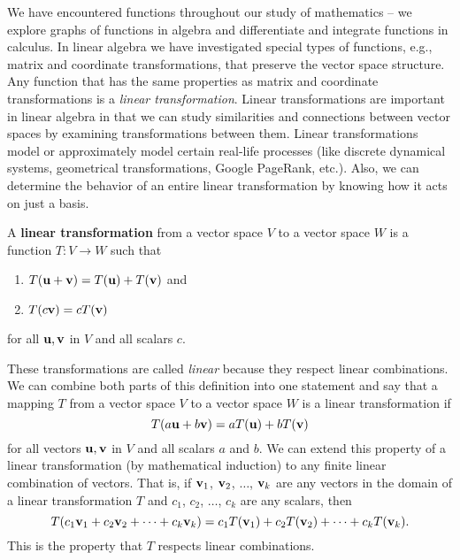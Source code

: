 We have encountered functions throughout our study of mathematics -- we explore graphs of functions in algebra and differentiate and integrate functions in calculus. In linear algebra we have investigated special types of functions, e.g., matrix and coordinate transformations, that preserve the vector space structure. Any function that has the same properties as matrix and coordinate transformations is a \emph{linear transformation}. Linear transformations are important in linear algebra in that we can study similarities and connections between vector spaces by examining transformations between them. Linear transformations model or approximately model certain real-life processes (like discrete dynamical systems, geometrical transformations, Google PageRank, etc.). Also, we can determine the behavior of an entire linear transformation  by knowing how it acts on just a basis.

\begin{definition} A \textbf{linear transformation} from a vector space $V$ to a vector space $W$ is a function $T: V \to W$ such that
\begin{enumerate}
\item $T(\mathbf{u} + \mathbf{v}) = T(\mathbf{u}) + T(\mathbf{v})$ and
\item $T(c\mathbf{v}) = cT(\mathbf{v})$
\end{enumerate}
for all $\mathbf{u}, \mathbf{v}$ in $V$ and all scalars $c$.
\end{definition}

These transformations are called \emph{linear} because they respect linear combinations. We can combine both parts of this definition into one statement and say that a mapping $T$ from a vector space $V$ to a vector space $W$ is a linear transformation if
\[T(a\mathbf{u} + b \mathbf{v}) = aT(\mathbf{u}) + bT(\mathbf{v})\]
for all vectors $\mathbf{u}, \mathbf{v}$ in $V$ and all scalars $a$ and $b$. We can extend this property of a linear transformation (by mathematical induction) to any finite linear combination of vectors. That is, if $\mathbf{v}_1$, $\mathbf{v}_2$, $\ldots$, $\mathbf{v}_k$ are any vectors in the domain of a linear transformation $T$ and $c_1$, $c_2$, $\ldots$, $c_k$ are any scalars, then
\[T(c_1 \mathbf{v}_1 + c_2 \mathbf{v}_2 + \cdots + c_k \mathbf{v}_k) = c_1 T(\mathbf{v}_1) + c_2 T(\mathbf{v}_2) + \cdots + c_k T(\mathbf{v}_k).\]
This is the property that $T$ respects linear combinations.

